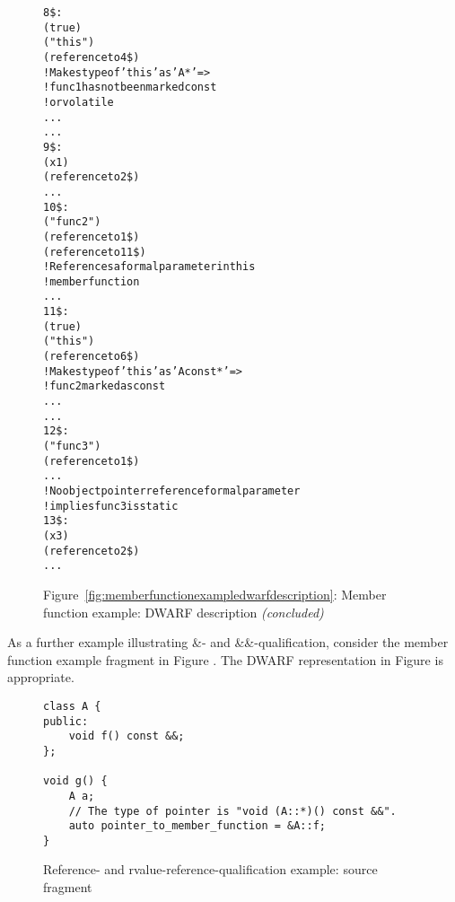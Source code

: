 \begin{figure}[p]
\begin{dwflisting}
\begin{alltt}
8\$:        \DWTAGformalparameter
                \DWATartificial(true)
                \DWATname("this")
                \DWATtype(reference to 4\$)
                    ! Makes type of 'this' as 'A*' =>
                    ! func1 has not been marked const 
                    ! or volatile
                \DWATlocation ...
                ...
9\$:        \DWTAGformalparameter
                \DWATname(x1)
                \DWATtype(reference to 2\$)
                ...
10\$:    \DWTAGsubprogram
             \DWATdeclaration
             \DWATname("func2")
             \DWATtype(reference to 1\$)
             \DWATobjectpointer(reference to 11\$) 
             ! References a formal parameter in this 
             ! member function
             ...
11\$:        \DWTAGformalparameter
                 \DWATartificial(true)
                 \DWATname("this")
                 \DWATtype(reference to 6\$)
                 ! Makes type of 'this' as 'A const*' =>
                 !     func2 marked as const
                 \DWATlocation ...
                 ...
12\$:    \DWTAGsubprogram
             \DWATdeclaration
             \DWATname("func3")
             \DWATtype(reference to 1\$)
             ...
                 ! No object pointer reference formal parameter
                 ! implies func3 is static
13\$:        \DWTAGformalparameter
                 \DWATname(x3)
                 \DWATtype(reference to 2\$)
                 ...
\end{alltt}
\end{dwflisting}
\begin{center}
Figure~\ref{fig:memberfunctionexampledwarfdescription}: Member function example: DWARF description \textit{(concluded)}
\end{center}
\end{figure}

As a further example illustrating \&- and \&\&-qualification, 
consider the member function example fragment in 
Figure .
The DWARF representation in 
Figure 
is appropriate.

\begin{figure}[h]
\begin{lstlisting}
class A {
public:
    void f() const &&;
};
   
void g() {
    A a;
    // The type of pointer is "void (A::*)() const &&".
    auto pointer_to_member_function = &A::f;
}
\end{lstlisting}
\caption{Reference- and rvalue-reference-qualification example: source \mbox{fragment}}
\label{fig:memberfunctionrefqualexamplesourcefragment}
\end{figure}

